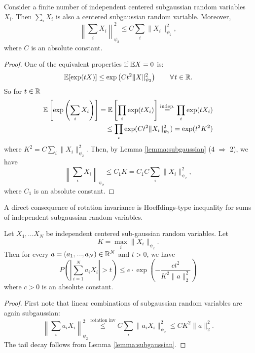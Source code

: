 \begin{lemma}
\begin{mdframed}
Consider a finite number of independent centered subgaussian random variables $X_i$. Then $\sum_i X_i$ is also a centered subgaussian random variable. Moreover,
\begin{equation*}
\left\|
\sum_i X_i
\right\|^2_{\psi_2} \leq C\sum_i\|X_i\|_{\psi_2}^2,
\end{equation*}
where $C$ is an absolute constant.
\end{mdframed}
\begin{proof}
One of the equivalent properties if $\mathbb{E} X=0$ is:
\begin{equation*}
\E [\exp(tX)] \leq \exp \left( 
Ct^2 \|X\|_{\psi_2}^2\right)	\quad\quad \forall t\in\R.
\end{equation*}
So for $t\in \mathbb{R}$
\begin{equation*}
\begin{split}
\mathbb{E} \left[\exp\left(
\sum_i X_i
\right) \right] = \mathbb{E} \left[
\prod_i \exp(tX_i)
\right]
\overset{\text{indep.}}{=}
\prod_i \exp(tX_i)	\\
\leq \prod_i \exp(Ct^2 \|X_i\|_{\psi_2}^2) = \exp(t^2K^2)
\end{split}
\end{equation*}
where $K^2 = C\sum_i\|X_i\|_{\psi_2}^2$. Then, by Lemma \ref{lemma:subgaussian} (4 $\Rightarrow$ 2), we have
$$\left\|
\sum_i X_i
\right\|_{\psi_2}\leq C_1 K=C_1C\sum_i \|X_i\|_{\psi_2}^2,$$
where $C_1$ is an absolute constant.
\end{proof}
\end{lemma}
A direct consequence of rotation invariance is Hoeffdings-type inequality for sums of independent subgaussian random variables.
\begin{prop} \label{prop:hoeffding-subg}
\begin{mdframed}
Let $X_1,...X_N$ be independent centered sub-gaussian random variables. Let $$K = \max_i \|X_i\|_{\psi_2}.$$ Then for every $a=(a_1,...,a_N)\in \mathbb{R}^N$ and $t>0$, we have
\begin{equation*}
P\left(
\left|
\sum_{i=1}^N a_iX_i
\right| > t
\right) \leq e \cdot \exp \left(
- \frac{ct^2}{K^2 \|a\|_2^2}
\right)
\end{equation*}
where $c>0$ is an absolute constant.
\end{mdframed}
\begin{proof} First note that linear combinations of subgaussian random variables are again subgaussian:
\begin{equation*}
\left\| \sum_i a_iX_i\right\|_{\psi_2}^2 \overset{\text{rotation inv}}{\leq} C\sum_i \|a_iX_i\|^2_{\psi_2} \leq CK^2\|a\|_2^2.
\end{equation*}
The tail decay follows from Lemma \ref{lemma:subgaussian}.%
\end{proof}
\end{prop}
